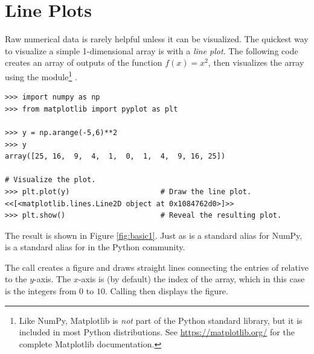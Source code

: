
\section*{Line Plots} %

Raw numerical data is rarely helpful unless it can be visualized.
The quickest way to visualize a simple 1-dimensional array is with a \emph{line plot}.
The following code creates an array of outputs of the function $f(x) = x^2$, then visualizes the array using the  module\footnote{Like NumPy, Matplotlib is \emph{not} part of the Python standard library, but it is included in most Python distributions. See \url{https://matplotlib.org/} for the complete Matplotlib documentation.} \cite{Hunter:2007}.

\begin{lstlisting}
>>> import numpy as np
>>> from matplotlib import pyplot as plt

>>> y = np.arange(-5,6)**2
>>> y
array([25, 16,  9,  4,  1,  0,  1,  4,  9, 16, 25])

# Visualize the plot.
>>> plt.plot(y)                     # Draw the line plot.
<<[<matplotlib.lines.Line2D object at 0x1084762d0>]>>
>>> plt.show()                      # Reveal the resulting plot.
\end{lstlisting}

The result is shown in Figure \ref{fig:basic1}.
Just as  is a standard alias for NumPy,  is a standard alias for  in the Python community.

The call  creates a figure and draws straight lines connecting the entries of  relative to the $y$-axis.
The $x$-axis is (by default) the index of the array, which in this case is the integers from $0$ to $10$.
Calling  then displays the figure.

